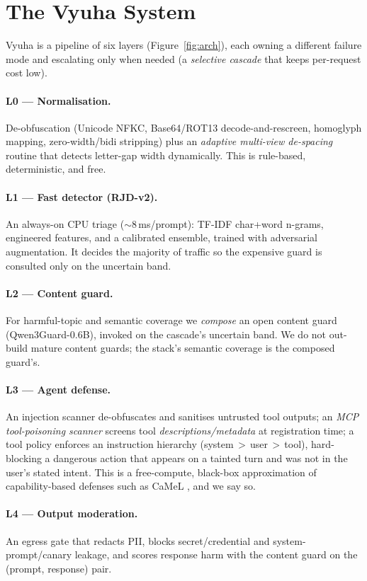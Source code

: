 \documentclass[11pt]{article}
\begin{document}
\section{The Vyuha System}
Vyuha is a pipeline of six layers (Figure~\ref{fig:arch}), each owning a different failure mode and
escalating only when needed (a \emph{selective cascade} that keeps per-request cost low).

\paragraph{L0 --- Normalisation.} De-obfuscation (Unicode NFKC, Base64/ROT13 decode-and-rescreen,
homoglyph mapping, zero-width/bidi stripping) plus an \emph{adaptive multi-view de-spacing} routine
that detects letter-gap width dynamically. This is rule-based, deterministic, and free.

\paragraph{L1 --- Fast detector (RJD-v2).} An always-on CPU triage ($\sim$8\,ms/prompt):
TF-IDF char+word n-grams, engineered features, and a calibrated ensemble, trained with adversarial
augmentation. It decides the majority of traffic so the expensive guard is consulted only on the
uncertain band.

\paragraph{L2 --- Content guard.} For harmful-topic and semantic coverage we \emph{compose} an open
content guard (Qwen3Guard-0.6B), invoked on the cascade's uncertain band. We do not out-build mature
content guards; the stack's semantic coverage is the composed guard's.

\paragraph{L3 --- Agent defense.} An injection scanner de-obfuscates and sanitises untrusted tool
outputs; an \emph{MCP tool-poisoning scanner} screens tool \emph{descriptions/metadata} at
registration time; a tool policy enforces an instruction hierarchy (system\,$>$\,user\,$>$\,tool),
hard-blocking a dangerous action that appears on a tainted turn and was not in the user's stated
intent. This is a free-compute, black-box approximation of capability-based defenses such as CaMeL
\citep{camel}, and we say so.

\paragraph{L4 --- Output moderation.} An egress gate that redacts PII, blocks secret/credential and
system-prompt/canary leakage, and scores response harm with the content guard on the
(prompt, response) pair.
\end{document}
